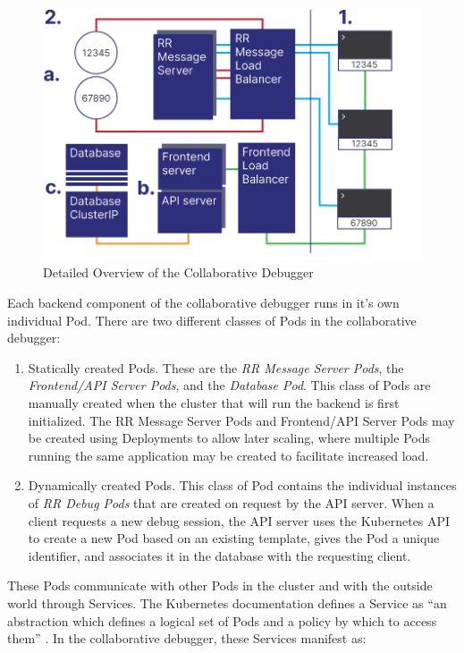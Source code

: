 \documentclass[12pt]{article}
\begin{document}
\begin{figure}[h!]

  \includegraphics[scale=.9]{detailed_system}
  \centering
  \caption{Detailed Overview of the Collaborative Debugger}
  \label{debugger:detailedoverview}
\end{figure}

Each backend component of the collaborative debugger runs in it's own
individual Pod.  There are two different classes of Pods in the
collaborative debugger:

\begin{enumerate}
\item Statically created Pods.  These are the \textit{RR Message
    Server Pods}, the \textit{Frontend/API Server Pods}, and the
  \textit{Database Pod}.  This class of Pods are manually created when
  the cluster that will run the backend is first initialized.  The RR
  Message Server Pods and Frontend/API Server Pods may be created
  using Deployments \cite{k8s_docs} to allow later scaling, where
  multiple Pods running the same application may be created to
  facilitate increased load.
\item Dynamically created Pods.  This class of Pod contains the
  individual instances of \textit{RR Debug Pods} that are created on
  request by the API server.  When a client requests a new debug
  session, the API server uses the Kubernetes API to create a new Pod
  based on an existing template, gives the Pod a unique identifier,
  and associates it in the database with the requesting client.
\end{enumerate}

These Pods communicate with other Pods in the cluster and with the
outside world through Services.  The Kubernetes documentation defines
a Service as ``an abstraction which defines a logical set of Pods and
a policy by which to access them'' \cite{k8s_docs}.  In the
collaborative debugger, these Services manifest as:
\end{document}
